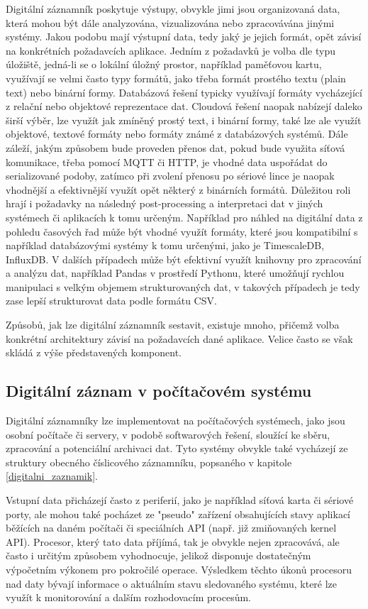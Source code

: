 Digitální záznamník poskytuje výstupy, obvykle jimi jsou organizovaná data, která mohou být dále analyzována, vizualizována nebo zpracovávána jinými systémy. Jakou podobu mají výstupní data, tedy jaký je jejich formát, opět závisí na konkrétních požadavcích aplikace. Jedním z požadavků je volba dle typu úložiště, jedná-li se o lokální úložný prostor, například paměťovou kartu, využívají se velmi často typy formátů, jako třeba formát prostého textu (plain text) nebo binární formy. Databázová řešení typicky využívají formáty vycházející z relační nebo objektové reprezentace dat. Cloudová řešení naopak nabízejí daleko širší výběr, lze využít jak zmíněný prostý text, i binární formy, také lze ale využít objektové, textové formáty nebo formáty známé z databázových systémů. Dále záleží, jakým způsobem bude proveden přenos dat, pokud bude využita síťová komunikace, třeba pomocí MQTT či HTTP, je vhodné data uspořádat do serializované podoby, zatímco při zvolení přenosu po sériové lince je naopak vhodnější a efektivnější využít opět některý z binárních formátů. Důležitou roli hrají i požadavky na následný post-processing a interpretaci dat v jiných systémech či aplikacích k tomu určeným. Například pro náhled na digitální data z pohledu časových řad může být vhodné využít formáty, které jsou kompatibilní s například databázovými systémy k tomu určenými, jako je TimescaleDB, InfluxDB. V dalších případech může být efektivní využít knihovny pro zpracování a analýzu dat, například Pandas v prostředí Pythonu, které umožňují rychlou manipulaci s velkým objemem strukturovaných dat, v takových případech je tedy zase lepší strukturovat data podle formátu CSV. \cite{medium_optimalization_iot_data_storage_timescaledb}

Způsobů, jak lze digitální záznamník sestavit, existuje mnoho, přičemž volba konkrétní architektury závisí na požadavcích dané aplikace. Velice často se však skládá z výše představených komponent. 

\subsection{Digitální záznam v počítačovém systému}
Digitální záznamníky lze implementovat na počítačových systémech, jako jsou osobní počítače či servery, v podobě softwarových řešení, sloužící ke sběru, zpracování a potenciální archivaci dat. Tyto systémy obvykle také vycházejí ze struktury obecného číslicového záznamníku, popsaného v kapitole \ref{digitalni_zaznamik}. 

Vstupní data přicházejí často z periferií, jako je například síťová karta či sériové porty, ale mohou také pocházet ze "pseudo" zařízení obsahujících stavy aplikací běžících na daném počítači či speciálních API (např. již zmiňovaných kernel API). Procesor, který tato data příjímá, tak je obvykle nejen zpracovává, ale často i určitým způsobem vyhodnocuje, jelikož disponuje dostatečným výpočetním výkonem pro pokročilé operace. Výsledkem těchto úkonů procesoru nad daty bývají informace o aktuálním stavu sledovaného systému, které lze využít k monitorování a dalším rozhodovacím procesům. \cite{linux_in_action_log_and_monitoring}

